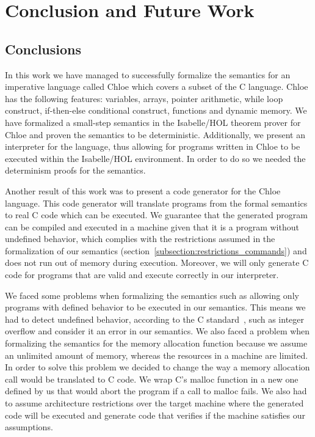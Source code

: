 \chapter{Conclusion and Future Work}\label{chapter:conclusion}

\section{Conclusions}

In this work we have managed to successfully formalize the semantics for an imperative language called Chloe which covers a subset of the C language.
Chloe has the following features: variables, arrays, pointer arithmetic, while loop construct, if-then-else conditional construct, functions and dynamic memory.
We have formalized a small-step semantics in the Isabelle/HOL theorem prover for Chloe and proven the semantics to be deterministic.
Additionally, we present an interpreter for the language, thus allowing for programs written in Chloe to be executed within the Isabelle/HOL environment.
In order to do so we needed the determinism proofs for the semantics.

Another result of this work was to present a code generator for the Chloe language.
This code generator will translate programs from the formal semantics to real C code which can be executed.
We guarantee that the generated program can be compiled and executed in a machine given that it is a program without undefined behavior, which complies with the restrictions assumed in the formalization of our semantics (section~\ref{subsection:restrictions_commands}) and does not run out of memory during execution.
Moreover, we will only generate C code for programs that are valid and execute correctly in our interpreter.

We faced some problems when formalizing the semantics such as allowing only programs with defined behavior to be executed in our semantics.
This means we had to detect undefined behavior, according to the C standard~\parencite{c99}, such as integer overflow and consider it an error in our semantics.
We also faced a problem when formalizing the semantics for the memory allocation function because we assume an unlimited amount of memory, whereas the resources in a machine are limited.
In order to solve this problem we decided to change the way a memory allocation call would be translated to C code.
We wrap C's malloc function in a new one defined by us that would abort the program if a call to malloc fails.
We also had to assume architecture restrictions over the target machine where the generated code will be executed and generate code that verifies if the machine satisfies our assumptions.

